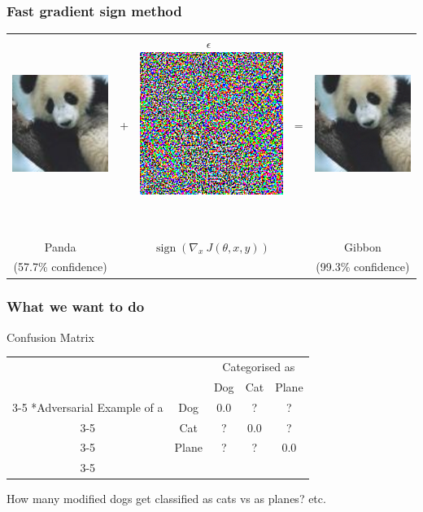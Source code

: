 \documentclass[10pt,usepdftitle=false,aspectratio=169]{beamer}
\begin{document}
\begin{frame}
	\frametitle{Fast gradient sign method}
	\begin{tabular}{ccccc}
		\includegraphics[align=c,width=0.28\columnwidth]{plots/panda_577.png} & \Huge{+} & \Huge{\textbf{$\epsilon$}}\ \includegraphics[align=c,width=0.28\columnwidth]{plots/nematode_082.png}\ & \Huge{=} & \includegraphics[align=c,width=0.28\columnwidth]{plots/gibbon_993.png} \\~\\
		\huge{Panda} &&\qquad \large{$\operatorname{sign}(\nabla_x\ J(\theta,x,y))$}&& \huge{Gibbon} \\
		(57.7\% confidence) &&&& (99.3\% confidence) 
	\end{tabular}
\end{frame}

\begin{frame}[fragile]
	\frametitle{What we want to do}
	\begin{block}{Confusion Matrix}
		\begin{table}
			\setlength{\extrarowheight}{2pt}
			\begin{tabular}{cc|c|c|c|}
				& \multicolumn{1}{c}{} & \multicolumn{3}{c}{Categorised as}\\
				& \multicolumn{1}{c}{} & \multicolumn{1}{c}{Dog}  & \multicolumn{1}{c}{Cat} & \multicolumn{1}{c}{Plane} \\\cline{3-5}
				\multirow{3}*{Adversarial Example of a}  & Dog & 0.0 & ? & ?\\\cline{3-5}
				& Cat & ? & 0.0 &  ? \\\cline{3-5}
				& Plane & ? & ? &  0.0 \\\cline{3-5}
			\end{tabular}
		\end{table}
		How many modified dogs get classified as cats vs as planes? etc.
	\end{block}
\end{frame}
\end{document}
